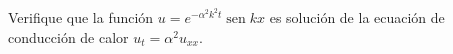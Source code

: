 \item Verifique que la función $u = e^{-\alpha^2 k^2 t} \operatorname{sen} kx$ es solución de la ecuación de conducción de calor $u_t = \alpha^2 u_{xx}$.
